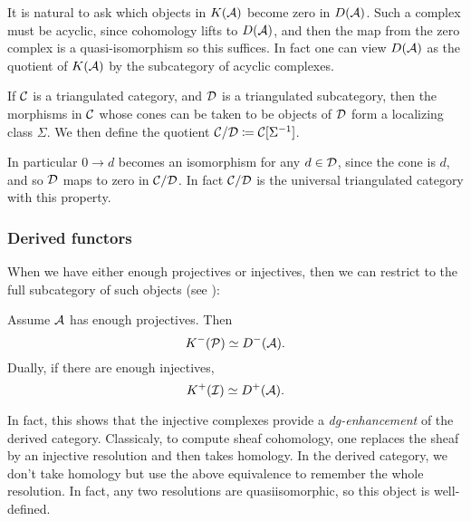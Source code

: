 It is natural to ask which objects in $K(\mathcal{A})$ become zero in $D(\mathcal{A})$. Such
a complex must be acyclic, since cohomology lifts to $D(\mathcal{A})$, and then the
map from the zero complex is a quasi-isomorphism so this suffices. In fact one
can view $D(\mathcal{A})$ as the quotient of $K(\mathcal{A})$ by the subcategory of acyclic
complexes.

\begin{definition}[label=defn:verdierquotient]{}{}
    If $\mathcal{C}$ is a triangulated category, and $\mathcal{D}$ is a triangulated
    subcategory, then the morphisms in $\mathcal{C}$ whose cones can be taken to be
    objects of $\mathcal{D}$ form a localizing class $\Sigma$. We then define the
    quotient $\mathcal{C}/\mathcal{D}\coloneqq\mathcal{C}[\Sigma^{-1}]$.
\end{definition}

\begin{remark}{}
    In particular $0\to d$ becomes an isomorphism for any $d\in\mathcal{D}$, since the
    cone is $d$, and so $\mathcal{D}$ maps to zero in $\mathcal{C}/\mathcal{D}$. In fact
    $\mathcal{C}/\mathcal{D}$ is the universal triangulated category with this property.
\end{remark}

\subsubsection{Derived functors}

When we have either enough projectives or injectives, then we can restrict to the full subcategory of such objects (see \cite[Proposition~2.40]{Huybrechts}):

\begin{theorem}[label=thm:DfromK]{}{}
    Assume $\mathcal{A}$ has enough projectives. Then
    \begin{equation*}
        K^-(\mathcal{P}) \simeq D^-(\mathcal{A}).
    \end{equation*}
    Dually, if there are enough injectives,
    \begin{equation*}
        K^+(\mathcal{I}) \simeq D^+(\mathcal{A}).
    \end{equation*}
\end{theorem}

In fact, this shows that the injective complexes provide a \emph{dg-enhancement} of the derived category. Classicaly, to compute sheaf cohomology, one replaces the sheaf by an injective resolution and then takes homology. In the derived category, we don't take homology but use the above equivalence to remember the whole resolution. In fact, any two resolutions are quasiisomorphic, so this object is well-defined.

